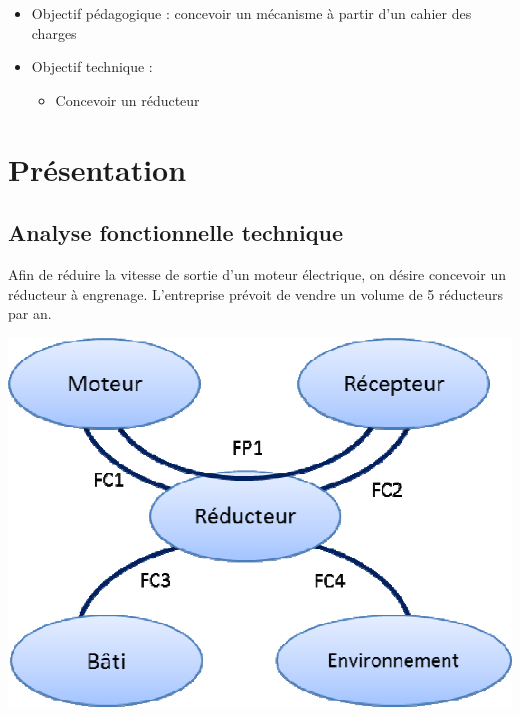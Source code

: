\documentclass[11pt,oneside]{article}
\begin{document}
\begin{contexte}
\begin{itemize}
\item Objectif pédagogique : concevoir un mécanisme à partir d'un cahier des charges
\item Objectif technique : 
\begin{itemize}
\item Concevoir un réducteur
\end{itemize}
\end{itemize}
\end{contexte}



\begin{minipage}[c]{.43\linewidth}

\section*{Présentation}
\subsection*{Analyse fonctionnelle technique}

Afin de réduire la vitesse de sortie d'un moteur électrique, on désire concevoir un réducteur à engrenage. L'entreprise prévoit de vendre un volume de 5 réducteurs par an. 

\end{minipage}\hfill
\begin{minipage}[c]{.43\linewidth}
\begin{center}
\includegraphics[width=.85\textwidth]{png/img1}
\end{center}
\end{minipage}
\end{document}

